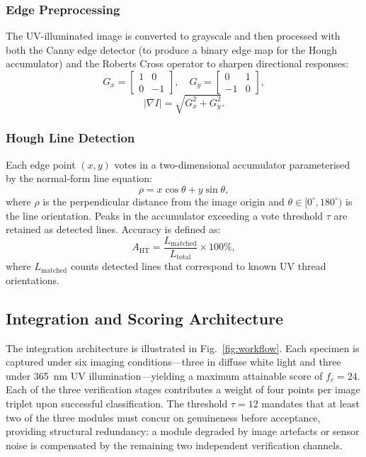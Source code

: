 \documentclass[journal]{IEEEtran}
\begin{document}
\subsubsection{Edge Preprocessing}
The UV-illuminated image is converted to grayscale and then processed with both the Canny edge detector (to produce a binary edge map for the Hough accumulator) and the Roberts Cross operator to sharpen directional responses:
\begin{equation}
  G_x = \begin{bmatrix} 1 & 0 \\ 0 & -1 \end{bmatrix}\!, \quad
  G_y = \begin{bmatrix} 0 & 1 \\ -1 & 0 \end{bmatrix}\!,
  \label{eq:roberts}
\end{equation}
\begin{equation}
  \lvert\nabla I\rvert = \sqrt{G_x^2 + G_y^2}.
  \label{eq:gradient}
\end{equation}

\subsubsection{Hough Line Detection}
Each edge point $(x, y)$ votes in a two-dimensional accumulator parameterised by the normal-form line equation:
\begin{equation}
  \rho = x\cos\theta + y\sin\theta,
  \label{eq:hough}
\end{equation}
where $\rho$ is the perpendicular distance from the image origin and $\theta \in [0^{\circ}, 180^{\circ})$ is the line orientation. Peaks in the accumulator exceeding a vote threshold $\tau$ are retained as detected lines. Accuracy is defined as:
\begin{equation}
  A_{\mathrm{HT}} = \frac{L_{\mathrm{matched}}}{L_{\mathrm{total}}} \times 100\%,
  \label{eq:ht_acc}
\end{equation}
where $L_{\mathrm{matched}}$ counts detected lines that correspond to known UV thread orientations.

\subsection{Integration and Scoring Architecture}
\label{subsec:integration}
The integration architecture is illustrated in Fig.~\ref{fig:workflow}. Each specimen is captured under six imaging conditions---three in diffuse white light and three under 365~nm UV illumination---yielding a maximum attainable score of $f_c = 24$. Each of the three verification stages contributes a weight of four points per image triplet upon successful classification. The threshold $\tau = 12$ mandates that at least two of the three modules must concur on genuineness before acceptance, providing structural redundancy: a module degraded by image artefacts or sensor noise is compensated by the remaining two independent verification channels.
\end{document}
